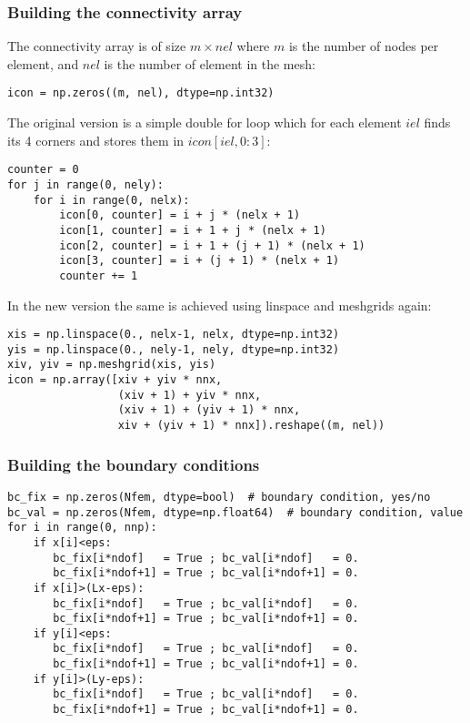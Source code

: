 \subsubsection*{Building the connectivity array}

The connectivity array is of size $m \times nel$ 
where $m$ is the number of nodes per element, and $nel$ is the number 
of element in the mesh: 

\begin{lstlisting}
icon = np.zeros((m, nel), dtype=np.int32)
\end{lstlisting}

The original version is a simple double for loop
which for each element $iel$ finds its 4 corners and 
stores them in $icon[iel,0:3]$:

\begin{lstlisting}
counter = 0
for j in range(0, nely):
    for i in range(0, nelx):
        icon[0, counter] = i + j * (nelx + 1)
        icon[1, counter] = i + 1 + j * (nelx + 1)
        icon[2, counter] = i + 1 + (j + 1) * (nelx + 1)
        icon[3, counter] = i + (j + 1) * (nelx + 1)
        counter += 1
\end{lstlisting}

In the new version the same is achieved
using linspace and meshgrids again:

\begin{lstlisting}
xis = np.linspace(0., nelx-1, nelx, dtype=np.int32)
yis = np.linspace(0., nely-1, nely, dtype=np.int32)
xiv, yiv = np.meshgrid(xis, yis)
icon = np.array([xiv + yiv * nnx,
                 (xiv + 1) + yiv * nnx,
                 (xiv + 1) + (yiv + 1) * nnx,
                 xiv + (yiv + 1) * nnx]).reshape((m, nel))
\end{lstlisting}


\subsubsection*{Building the boundary conditions} 


\begin{lstlisting}
bc_fix = np.zeros(Nfem, dtype=bool)  # boundary condition, yes/no
bc_val = np.zeros(Nfem, dtype=np.float64)  # boundary condition, value
for i in range(0, nnp):
    if x[i]<eps:
       bc_fix[i*ndof]   = True ; bc_val[i*ndof]   = 0.
       bc_fix[i*ndof+1] = True ; bc_val[i*ndof+1] = 0.
    if x[i]>(Lx-eps):
       bc_fix[i*ndof]   = True ; bc_val[i*ndof]   = 0.
       bc_fix[i*ndof+1] = True ; bc_val[i*ndof+1] = 0.
    if y[i]<eps:
       bc_fix[i*ndof]   = True ; bc_val[i*ndof]   = 0.
       bc_fix[i*ndof+1] = True ; bc_val[i*ndof+1] = 0.
    if y[i]>(Ly-eps):
       bc_fix[i*ndof]   = True ; bc_val[i*ndof]   = 0.
       bc_fix[i*ndof+1] = True ; bc_val[i*ndof+1] = 0.
\end{lstlisting}



